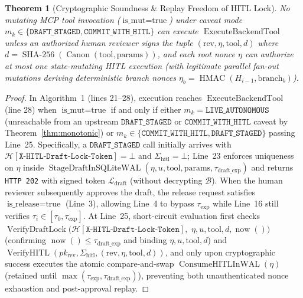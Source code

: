 \documentclass[conference,10pt]{IEEEtran}
\newtheorem{theorem}{Theorem}
\begin{document}
\begin{theorem}[Cryptographic Soundness \& Replay Freedom of HITL Lock]
\label{thm:hitl}
No mutating MCP tool invocation ($\text{is\_mut} = \text{true}$) under caveat mode $m_k \in \{\texttt{DRAFT\_STAGED}, \texttt{COMMIT\_WITH\_HITL}\}$ can execute $\operatorname{ExecuteBackendTool}$ unless an authorized human reviewer signs the tuple $(\text{rev}, \eta, \text{tool}, d)$ where $d = \operatorname{SHA-256}(\operatorname{Canon}(\text{tool}, \text{params}))$, and each root nonce $\eta$ can authorize at most one state-mutating HITL execution (with legitimate parallel fan-out mutations deriving deterministic branch nonces $\eta_b = \operatorname{HMAC}(H_{i-1}, \text{branch}_b)$).
\end{theorem}
\begin{proof}
In Algorithm~1 (lines 21--28), execution reaches $\operatorname{ExecuteBackendTool}$ (line 28) when $\text{is\_mut} = \text{true}$ if and only if either $m_k = \texttt{LIVE\_AUTONOMOUS}$ (unreachable from an upstream $\texttt{DRAFT\_STAGED}$ or $\texttt{COMMIT\_WITH\_HITL}$ caveat by Theorem~\ref{thm:monotonic}) or $m_k \in \{\texttt{COMMIT\_WITH\_HITL}, \texttt{DRAFT\_STAGED}\}$ passing Line~25. Specifically, a $\texttt{DRAFT\_STAGED}$ call initially arrives with $\mathcal{H}[\texttt{X-HITL-Draft-Lock-Token}] = \bot$ and $\Sigma_{\text{hitl}} = \bot$; Line~23 enforces uniqueness on $\eta$ inside $\operatorname{StageDraftInSQLiteWAL}(\eta, u, \text{tool}, \text{params}, \tau_{\text{draft\_exp}})$ and returns \texttt{HTTP 202} with signed token $\mathcal{L}_{\text{draft}}$ (without decrypting $\mathcal{B}$). When the human reviewer subsequently approves the draft, the release request satisfies $\text{is\_release} = \text{true}$ (Line~3), allowing Line~4 to bypass $\tau_{\exp}$ while Line~16 still verifies $\tau_i \in [\tau_0, \tau_{\exp}]$. At Line~25, short-circuit evaluation first checks $\operatorname{VerifyDraftLock}(\mathcal{H}[\texttt{X-HITL-Draft-Lock-Token}],$ $\eta, u, \text{tool}, d, \operatorname{now}())$ (confirming $\operatorname{now}() \le \tau_{\text{draft\_exp}}$ and binding $\eta, u, \text{tool}, d$) and $\operatorname{VerifyHITL}(pk_{\text{rev}}, \Sigma_{\text{hitl}}, (\text{rev}, \eta, \text{tool}, d))$, and only upon cryptographic success executes the atomic compare-and-swap $\operatorname{ConsumeHITLInWAL}(\eta)$ (retained until $\max(\tau_{\exp}, \tau_{\text{draft\_exp}})$), preventing both unauthenticated nonce exhaustion and post-approval replay.
\end{proof}
\end{document}
